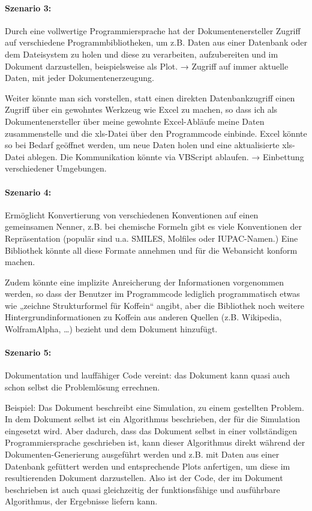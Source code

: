 \paragraph{Szenario 3:} Durch eine vollwertige Programmiersprache hat
der Dokumentenersteller Zugriff auf verschiedene Programmbibliotheken,
um z.B. Daten aus einer Datenbank oder dem Dateisystem zu holen und diese
zu verarbeiten, aufzubereiten und im Dokument darzustellen, beispielsweise
als Plot. → Zugriff auf immer aktuelle Daten, mit jeder Dokumentenerzeugung.

Weiter könnte man sich vorstellen, statt einen direkten Datenbankzugriff
einen Zugriff über ein gewohntes Werkzeug wie Excel zu machen,
so dass ich als Dokumentenersteller über meine gewohnte Excel-Abläufe
meine Daten zusammenstelle und die xls-Datei über den Programmcode einbinde.
Excel könnte so bei Bedarf geöffnet
werden, um neue Daten holen und eine aktualisierte xls-Datei ablegen. Die
Kommunikation könnte via VBScript ablaufen. → Einbettung
verschiedener Umgebungen.

\paragraph{Szenario 4:} Ermöglicht Konvertierung von verschiedenen
Konventionen auf einen gemeinsamen Nenner, z.B. bei chemische Formeln
gibt es viele Konventionen der Repräsentation (populär sind u.a.
SMILES, Molfiles oder IUPAC-Namen.)
Eine Bibliothek könnte all diese Formate annehmen und
für die Webansicht konform machen.

Zudem könnte eine implizite Anreicherung der Informationen vorgenommen werden,
so dass der Benutzer im Programmcode lediglich programmatisch etwas wie
„zeichne Strukturformel für Koffein“ angibt,
aber die Bibliothek noch weitere Hintergrundinformationen
zu Koffein aus anderen Quellen (z.B. Wikipedia, WolframAlpha, \ldots) bezieht
und dem Dokument hinzufügt.

\paragraph{Szenario 5:} Dokumentation
und lauffähiger Code vereint: das Dokument kann quasi auch schon selbst
die Problemlösung errechnen.

Beispiel: Das Dokument beschreibt eine Simulation, zu einem gestellten
Problem. In dem Dokument selbst ist ein Algorithmus beschrieben, der
für die Simulation eingesetzt wird. Aber dadurch, dass das Dokument selbst
in einer vollständigen Programmiersprache geschrieben ist, kann dieser
Algorithmus direkt während der Dokumenten-Generierung ausgeführt werden
und z.B. mit Daten aus einer Datenbank gefüttert werden und entsprechende Plots
anfertigen, um diese im resultierenden Dokument darzustellen.
Also ist der Code, der im Dokument beschrieben ist auch quasi gleichzeitig
der funktionsfähige und ausführbare Algorithmus, der Ergebnisse liefern kann.

